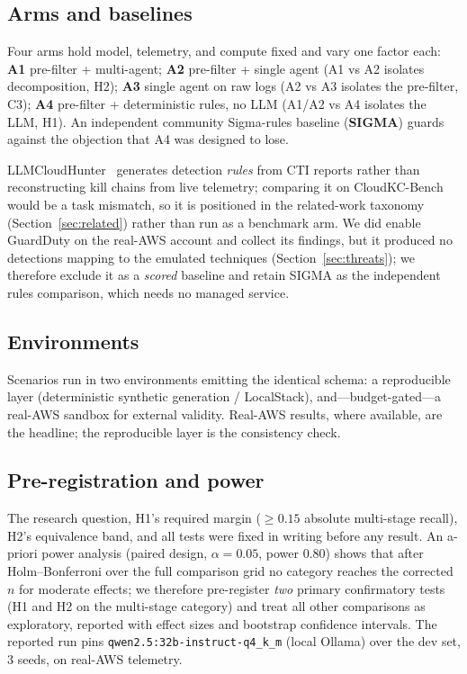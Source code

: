 \documentclass[journal]{IEEEtran}
\begin{document}
\subsection{Arms and baselines}
Four arms hold model, telemetry, and compute fixed and vary one factor each:
\textbf{A1} pre-filter + multi-agent; \textbf{A2} pre-filter + single agent
(A1 vs A2 isolates decomposition, H2); \textbf{A3} single agent on raw logs
(A2 vs A3 isolates the pre-filter, C3); \textbf{A4} pre-filter + deterministic rules,
no LLM (A1/A2 vs A4 isolates the LLM, H1). An independent community Sigma-rules
baseline (\textbf{SIGMA}) guards against the objection that A4 was designed to lose.

LLMCloudHunter~\cite{schwartz2025llmcloudhunter} generates detection \emph{rules} from
CTI reports rather than reconstructing kill chains from live telemetry; comparing it on
CloudKC-Bench would be a task mismatch, so it is positioned in the related-work taxonomy
(Section~\ref{sec:related}) rather than run as a benchmark arm. We did enable GuardDuty on
the real-AWS account and collect its findings, but it produced no detections mapping to the
emulated techniques (Section~\ref{sec:threats}); we therefore exclude it as a \emph{scored}
baseline and retain SIGMA as the independent rules comparison, which needs no managed service.

\subsection{Environments}
Scenarios run in two environments emitting the identical schema: a reproducible layer
(deterministic synthetic generation / LocalStack), and---budget-gated---a real-AWS
sandbox for external validity. Real-AWS results, where available, are the headline;
the reproducible layer is the consistency check.

\subsection{Pre-registration and power}
The research question, H1's required margin ($\geq 0.15$ absolute multi-stage recall),
H2's equivalence band, and all tests were fixed in writing before any result. An a-priori
power analysis (paired design, $\alpha=0.05$, power $0.80$) shows that after
Holm--Bonferroni over the full comparison grid no category reaches the corrected $n$ for
moderate effects; we therefore pre-register \emph{two} primary confirmatory tests
(H1 and H2 on the multi-stage category) and treat all other comparisons as exploratory,
reported with effect sizes and bootstrap confidence intervals. The reported run pins
\texttt{qwen2.5:32b-instruct-q4\_k\_m} (local Ollama) over the dev set, 3 seeds, on real-AWS telemetry.
\end{document}

